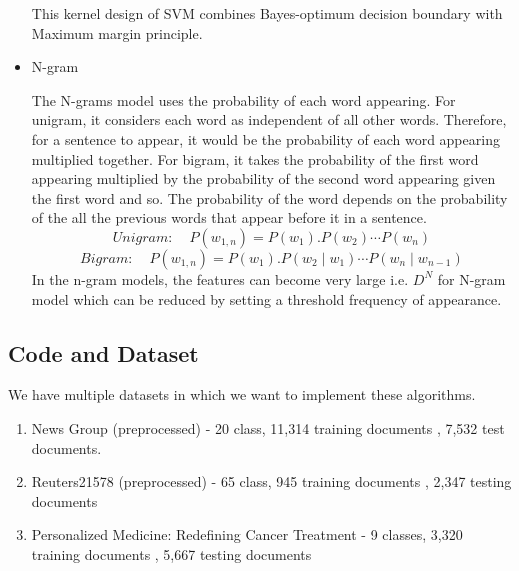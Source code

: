 \documentclass[a4paper, 11pt]{article}
\begin{document}
\begin{itemize}
		This kernel design of SVM combines Bayes-optimum decision boundary with Maximum margin principle. \cite{ding2014sensing}
		\item N-gram
		\par The N-grams model uses the probability of each word appearing. For unigram, it considers each word as independent of all other words. Therefore, for a sentence to appear, it would be the probability of each word appearing multiplied together. For bigram, it takes the probability of the first word appearing multiplied by the probability of the second word appearing given the first word and so. The probability of the word depends on the probability of the all the previous words that appear before it in a sentence. \cite{song1999general} \\
		\begin{equation}
		\textit{Unigram:}  \hspace{15pt} P(w_{1,n})  = P(w_1).P(w_2) \cdots P(w_n)
		\end{equation}
		\begin{equation}
		\textit{Bigram:}  \hspace{15pt} P(w_{1,n})  = P(w_1).P(w_2 \mid  w_1) \cdots P(w_n \mid w_{n-1})
		\end{equation}
		In the n-gram models, the features can become very large i.e. $D^N$ for N-gram model which can be reduced by setting a threshold frequency of appearance\cite{furnkranz1998study}.  \\
		

		
	\end{itemize}
	
	\subsection{Code and Dataset}
	We have multiple datasets in which we want to implement these algorithms. 
	\begin{enumerate}
		\item News Group (preprocessed) - 20 class, 11,314 training documents ,  7,532 test documents.
		\item Reuters21578 (preprocessed) - 65 class, 945 training documents ,  2,347 testing documents \cite{dataset}
		\item Personalized Medicine: Redefining Cancer Treatment - 9 classes,  3,320 training documents , 5,667 testing documents  \cite{kaggledataset}
	\end{enumerate}
		
\end{document}
